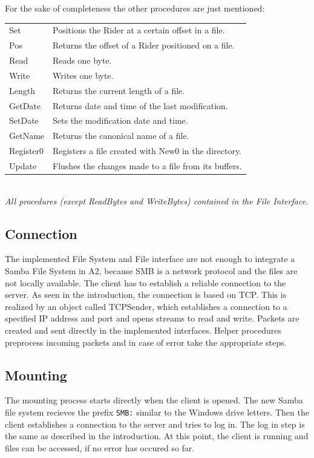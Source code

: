 \documentclass[11pt,a4paper]{book}
\begin{document}
For the sake of completeness the other procedures are just mentioned:

\begin{center}
\begin{tabular}{l|l}
Set & Positions the Rider at a certain offset in a file. \\
Pos & Returns the offset of a Rider positioned on a file. \\
Read & Reads one byte. \\
Write & Writes one byte. \\
Length & Returns the current length of a file. \\
GetDate & Returns date and time of the last modification. \\
SetDate & Sets the modification date and time. \\
GetName & Returns the canonical name of a file. \\
Register0 & Registers a file created with New0 in the directory. \\
Update & Flushes the changes made to a file from its buffers. \\
\end{tabular} \\
\vspace{6pt}
\textit{All procedures (except ReadBytes and WriteBytes) contained in the File Interface.}
\end{center}

\subsection{Connection}
The implemented File System and File interface are not enough to integrate a Samba File System in A2, because SMB is a network protocol and the files are not locally available. The client has to establish a reliable connection to the server. As seen in the introduction, the connection is based on TCP. This is realized by an object called TCPSender, which establishes a connection to a specified IP address and port and opens streams to read and write. Packets are created and sent directly in the implemented interfaces. Helper procedures preprocess incoming packets and in case of error take the appropriate steps.

\subsection{Mounting}
The mounting process starts directly when the client is opened. The new Samba file system recieves the prefix \texttt{SMB:} similar to the Windows drive letters. Then the client establishes a connection to the server and tries to log in. The log in step is the same as described in the introduction. At this point, the client is running and files can be accessed, if no error has occured so far.
\end{document}
